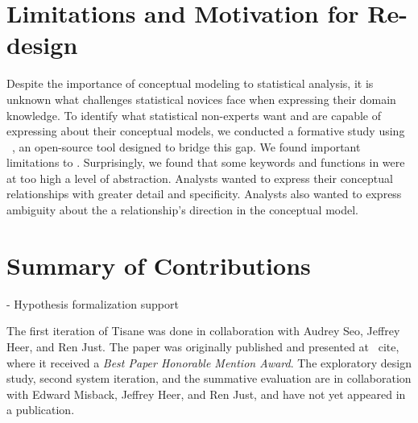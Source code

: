 

\section{Limitations and Motivation for Re-design}
Despite the importance of conceptual modeling to statistical analysis, it is
unknown what challenges statistical novices face when expressing their domain
knowledge. To identify what statistical non-experts want and are capable of
expressing about their conceptual models, we conducted a formative study using
\tisane~\cite{jun2022tisane}, an open-source tool designed to bridge this gap.
We found important limitations to \tisane. Surprisingly, we found that some
keywords and functions in \tisane were at too high a level of abstraction.
Analysts wanted to express their conceptual relationships with greater detail
and specificity. Analysts also wanted to express ambiguity about the a
relationship's direction in the conceptual model. 







\section{Summary of Contributions}
- Hypothesis formalization support


The first iteration of Tisane was done in collaboration with Audrey Seo, Jeffrey
Heer, and Ren Just. The paper was originally published and presented at
~cite{}, where it received a \textit{Best Paper Honorable
Mention Award}. The exploratory design study, second system iteration, and the
summative evaluation are in collaboration with Edward Misback, Jeffrey Heer, and
Ren Just, and have not yet appeared in a publication. 